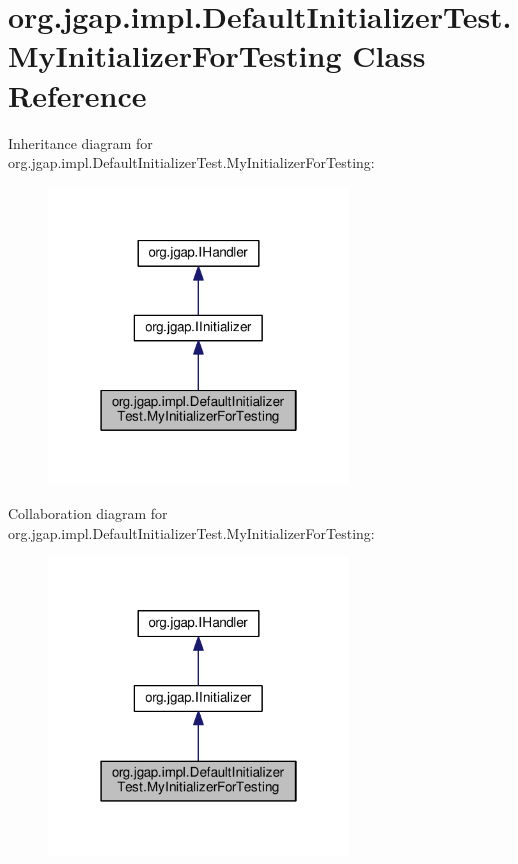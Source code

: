 \hypertarget{classorg_1_1jgap_1_1impl_1_1_default_initializer_test_1_1_my_initializer_for_testing}{\section{org.\-jgap.\-impl.\-Default\-Initializer\-Test.\-My\-Initializer\-For\-Testing Class Reference}
\label{classorg_1_1jgap_1_1impl_1_1_default_initializer_test_1_1_my_initializer_for_testing}
}


Inheritance diagram for org.\-jgap.\-impl.\-Default\-Initializer\-Test.\-My\-Initializer\-For\-Testing\-:
\nopagebreak
\begin{figure}[H]
\begin{center}
\leavevmode
\includegraphics[width=226pt]{classorg_1_1jgap_1_1impl_1_1_default_initializer_test_1_1_my_initializer_for_testing__inherit__graph}
\end{center}
\end{figure}


Collaboration diagram for org.\-jgap.\-impl.\-Default\-Initializer\-Test.\-My\-Initializer\-For\-Testing\-:
\nopagebreak
\begin{figure}[H]
\begin{center}
\leavevmode
\includegraphics[width=226pt]{classorg_1_1jgap_1_1impl_1_1_default_initializer_test_1_1_my_initializer_for_testing__coll__graph}
\end{center}
\end{figure}

